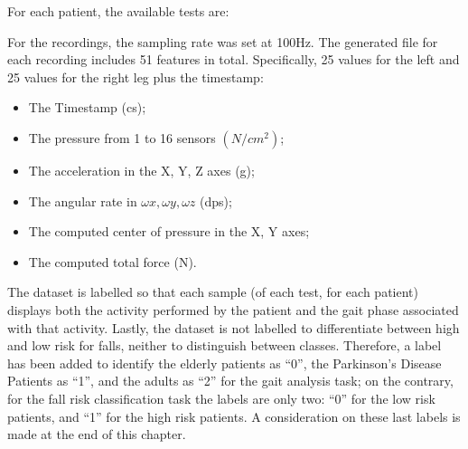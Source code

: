 For each patient, the available tests are:



For the recordings, the sampling rate was set at 100Hz. The generated file for each recording includes 51 features in total. Specifically, 25 values for the left and 25 values for the right leg plus the timestamp:

\begin{itemize}
    \item The Timestamp (cs);
    \item The pressure from 1 to 16 sensors $(N/cm^{2})$;
    \item The acceleration in the X, Y, Z axes (g);
    \item The angular rate in $\omega x, \omega y, \omega z$ (dps);
    \item The computed center of pressure in the X, Y axes; \item The computed total force (N).
\end{itemize}

The dataset is labelled so that each sample (of each test, for each patient) displays both the activity performed by the patient and the gait phase associated with that activity. 
Lastly, the dataset is not labelled to differentiate between high and low risk for falls, neither to distinguish between classes. Therefore, a label has been added to identify the elderly patients as \enquote{0}, the Parkinson's Disease Patients as \enquote{1}, and the adults as \enquote{2} for the gait analysis task; on the contrary, for the fall risk classification task the labels are only two: \enquote{0} for the low risk patients, and \enquote{1} for the high risk patients. A consideration on these last labels is made at the end of this chapter.


